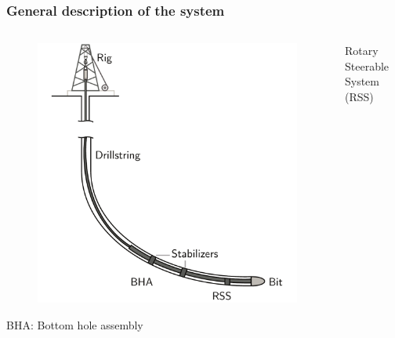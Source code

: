 \documentclass[10pt]{beamer}
\begin{document}
\begin{frame}\frametitle{General description of the system}
	\begin{columns}
	\hspace{1cm}	\begin{column}{0.6\textwidth}
		\begin{figure}[ht]\centering
				\includegraphics[width=1\textwidth]{images/drillingsystem.pdf}
			\end{figure}
			BHA: Bottom hole assembly
		\end{column}
		\begin{column}{0.4\textwidth}
			\centering
			Rotary Steerable System (RSS)
			\vspace{-10pt}	
			\begin{figure}[ht]
				\begin{minipage}[t]{1\textwidth}

\end{minipage}
\end{figure}
\end{column}
\end{columns}
\end{frame}
\end{document}
